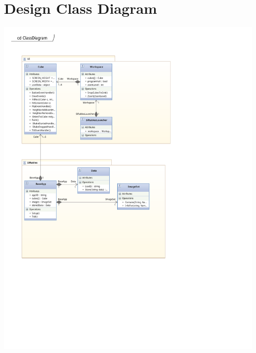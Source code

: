 \documentclass[12pt]{article}
\begin{document}
\section{Design Class Diagram}
\begin{center}
        \includegraphics{./pdfs/Models/Class Diagram.pdf}
\end{center}
\end{document}
